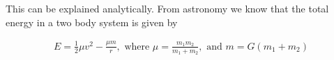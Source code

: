 \documentclass[norsk,a4paper,12pt]{article}
\begin{document}
\begin{figure}[H]
  \begin{center}
  \end{center}
 \caption{\textit{ }}
  \label{fig:edge}
\end{figure}

This can be explained analytically. From astronomy we know that the total energy in a two body system is given by

\begin{align}
 E = \frac{1}{2} \mu v^2 - \frac{\mu m}{r}, \text{ where } \mu = \frac{m_1 m_2}{m_1 + m_2}, \text{ and } m = G(m_1 + m_2)
\end{align}
\end{document}

